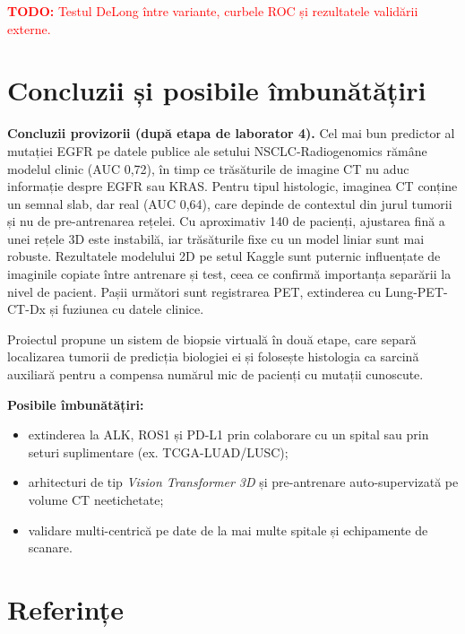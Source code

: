\documentclass[11pt, a4paper]{article}
\newcommand{\todo}[1]{\textcolor{red}{\textbf{TODO:} #1}}
\begin{document}
\todo{Testul DeLong între variante, curbele ROC și rezultatele validării externe.}

\section{Concluzii și posibile îmbunătățiri}
\textbf{Concluzii provizorii (după etapa de laborator 4).} Cel mai bun predictor al mutației EGFR pe datele publice ale setului NSCLC-Radiogenomics rămâne modelul clinic (AUC 0,72), în timp ce trăsăturile de imagine CT nu aduc informație despre EGFR sau KRAS. Pentru tipul histologic, imaginea CT conține un semnal slab, dar real (AUC 0,64), care depinde de contextul din jurul tumorii și nu de pre-antrenarea rețelei. Cu aproximativ 140 de pacienți, ajustarea fină a unei rețele 3D este instabilă, iar trăsăturile fixe cu un model liniar sunt mai robuste. Rezultatele modelului 2D pe setul Kaggle sunt puternic influențate de imaginile copiate între antrenare și test, ceea ce confirmă importanța separării la nivel de pacient. Pașii următori sunt registrarea PET, extinderea cu Lung-PET-CT-Dx și fuziunea cu datele clinice.

Proiectul propune un sistem de biopsie virtuală în două etape, care separă localizarea tumorii de predicția biologiei ei și folosește histologia ca sarcină auxiliară pentru a compensa numărul mic de pacienți cu mutații cunoscute.

\textbf{Posibile îmbunătățiri:}
\begin{itemize}
    \item extinderea la ALK, ROS1 și PD-L1 prin colaborare cu un spital sau prin seturi suplimentare (ex. TCGA-LUAD/LUSC);
    \item arhitecturi de tip \textit{Vision Transformer 3D} și pre-antrenare auto-supervizată pe volume CT neetichetate;
    \item validare multi-centrică pe date de la mai multe spitale și echipamente de scanare.
\end{itemize}

\section{Referințe}
\end{document}
